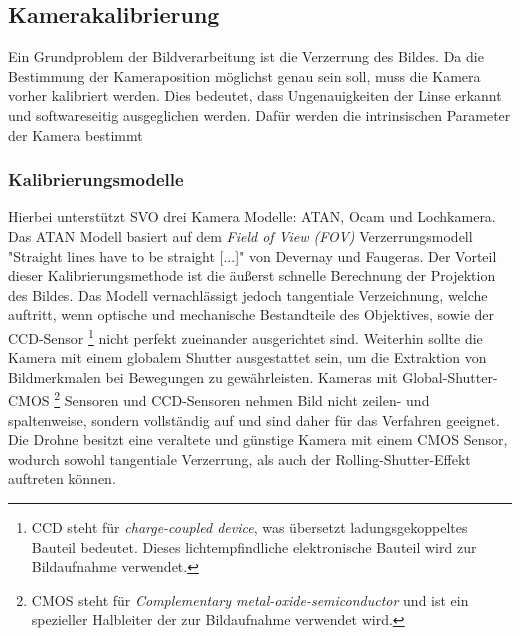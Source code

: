 \subsection{Kamerakalibrierung}
Ein Grundproblem der Bildverarbeitung ist die Verzerrung des Bildes. 
Da die Bestimmung der Kameraposition möglichst genau sein soll, muss die Kamera vorher kalibriert werden. Dies bedeutet, dass Ungenauigkeiten der Linse erkannt und softwareseitig ausgeglichen werden. Dafür werden die intrinsischen Parameter der Kamera bestimmt \newline

\subsubsection*{Kalibrierungsmodelle}
Hierbei unterstützt SVO drei Kamera Modelle: ATAN, Ocam und Lochkamera. \cite{svo_cameracalibration} \newline
Das ATAN Modell basiert auf dem \textit{Field of View \emph{(FOV)}} Verzerrungsmodell "Straight lines have to be straight [...]" von Devernay und Faugeras.\newline %
Der Vorteil dieser Kalibrierungsmethode ist die äußerst schnelle Berechnung der Projektion des Bildes. %
Das Modell vernachlässigt jedoch tangentiale Verzeichnung, welche auftritt, wenn optische und mechanische Bestandteile des Objektives, sowie der CCD-Sensor 
\footnote{CCD steht für \emph{charge-coupled device}, was übersetzt ladungsgekoppeltes Bauteil bedeutet. Dieses lichtempfindliche elektronische Bauteil wird zur Bildaufnahme verwendet.} 
nicht perfekt zueinander ausgerichtet sind. %
Weiterhin sollte die Kamera mit einem globalem Shutter ausgestattet sein, um die Extraktion von Bildmerkmalen bei Bewegungen zu gewährleisten. Kameras mit Global-Shutter-CMOS  
\footnote{CMOS steht für \emph{Complementary metal-oxide-semiconductor} und ist ein spezieller Halbleiter der zur Bildaufnahme verwendet wird.} %
Sensoren und CCD-Sensoren nehmen Bild nicht zeilen- und spaltenweise, sondern vollständig auf und sind daher für das Verfahren geeignet. \newline
Die Drohne besitzt eine veraltete und günstige Kamera mit einem CMOS Sensor, wodurch sowohl tangentiale Verzerrung, als auch der Rolling-Shutter-Effekt auftreten können. \newline
